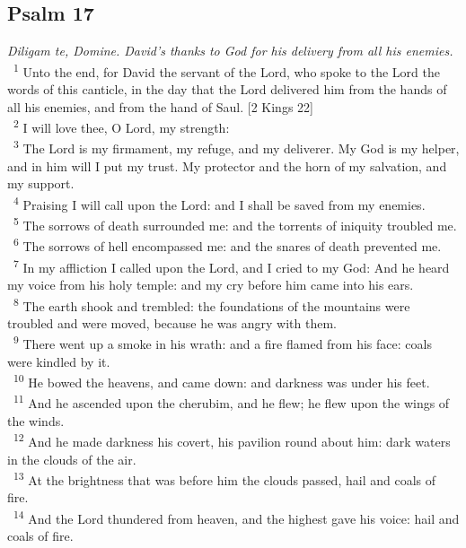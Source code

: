 \documentclass[a5paper,12pt]{article}
\begin{document}
\begin{multicols*}{2}
\section{Psalm 17}
\label{sec:orgb7c66d8}
\emph{Diligam te, Domine. David's thanks to God for his delivery from all his enemies.}\\

~\textsuperscript{1} Unto the end, for David the servant of the Lord, who spoke to the Lord the words of this canticle, in the day that the Lord delivered him from the hands of all his enemies, and from the hand of Saul. [2 Kings 22]\\
~\textsuperscript{2} I will love thee, O Lord, my strength:\\
~\textsuperscript{3} The Lord is my firmament, my refuge, and my deliverer. My God is my helper, and in him will I put my trust. My protector and the horn of my salvation, and my support.\\
~\textsuperscript{4} Praising I will call upon the Lord: and I shall be saved from my enemies.\\
~\textsuperscript{5} The sorrows of death surrounded me: and the torrents of iniquity troubled me.\\
~\textsuperscript{6} The sorrows of hell encompassed me: and the snares of death prevented me.\\
~\textsuperscript{7} In my affliction I called upon the Lord, and I cried to my God: And he heard my voice from his holy temple: and my cry before him came into his ears.\\
~\textsuperscript{8} The earth shook and trembled: the foundations of the mountains were troubled and were moved, because he was angry with them.\\
~\textsuperscript{9} There went up a smoke in his wrath: and a fire flamed from his face: coals were kindled by it.\\
~\textsuperscript{10} He bowed the heavens, and came down: and darkness was under his feet.\\
~\textsuperscript{11} And he ascended upon the cherubim, and he flew; he flew upon the wings of the winds.\\
~\textsuperscript{12} And he made darkness his covert, his pavilion round about him: dark waters in the clouds of the air.\\
~\textsuperscript{13} At the brightness that was before him the clouds passed, hail and coals of fire.\\
~\textsuperscript{14} And the Lord thundered from heaven, and the highest gave his voice: hail and coals of fire.\\

\end{multicols*}
\end{document}
